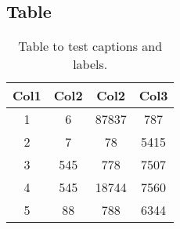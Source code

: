 \documentclass[13pt]{beamer}
\begin{document}
\subsection{Table}
\begin{frame}
  \begin{table}[H]
  \centering
  \begin{tabular}{||c c c c||} 
    \hline
    Col1 & Col2 & Col2 & Col3 \\ [0.5ex] 
    \hline\hline
    1 & 6 & 87837 & 787 \\ 
    2 & 7 & 78 & 5415 \\
    3 & 545 & 778 & 7507 \\
    4 & 545 & 18744 & 7560 \\
    5 & 88 & 788 & 6344 \\ [1ex] 
    \hline
  \end{tabular}
  \caption{Table to test captions and labels.}
  \label{tab:table}
  \end{table}
\end{frame}
\end{document}

